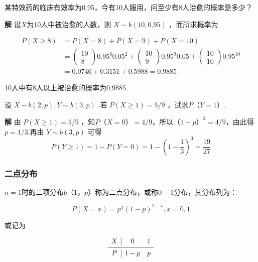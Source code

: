 \begin{example}
	某特效药的临床有效率为0.95，今有10人服用，问至少有8人治愈的概率是多少？
	
	\textbf{解} 设$ X $为10人中被治愈的人数，则 $X \sim b(10,0.95)$ ，而所求概率为
	
	\[
	\begin{aligned} P(X \geqslant 8) &=P(X=8)+P(X=9)+P(X=10) \\ &=\left( \begin{array}{c}{10} \\ {8}\end{array}\right) 0.95^{8} 0.05^{2}+\left( \begin{array}{c}{10} \\ {9}\end{array}\right) 0.95^{9} 0.05+\left( \begin{array}{c}{10} \\ {10}\end{array}\right) 0.95^{10} \\ &=0.0746+0.3151+0.5988=0.9885 \end{aligned}
	\]
	
	10人中有8人以上被治愈的概率为0.9885.
	
\end{example}

\begin{example}
	设 $X-b(2, p), Y \sim b(3, p)$ .若 $P(X \geqslant 1)=5 / 9$ ，试求$ P（Y=1） $.
	
	\textbf{解} 由 $P(X \geqslant 1)=5 / 9$ ，知$ P（X=0）=4/9 $，所以$ （1-p）^{2}=4/9 $，由此得$ p=1/3 $.再由 $Y \sim b(3, p)$ 可得
	\[
	P(Y \geqslant 1)=1-P(Y=0)=1-\left(1-\frac{1}{3}\right)^{3}=\frac{19}{27}
	\]
	
\end{example}

\subsubsection{二点分布}

$ n=1 $时的二项分布$ b（1，p） $称为二点分布，或称$ 0-1 $分布，其分布列为：

\begin{equation}
P(X=x)=p^{x}(1-p)^{1-x}, x=0,1 \label{eq:2.4.2}
\end{equation}

或记为

\[
\begin{array}{c|cc}
X     & 0     & 1 \\\midrule
P     & 1-p   & p \\
\end{array}
\]

